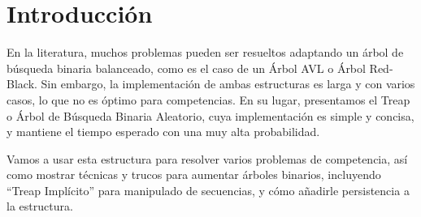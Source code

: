 \section{Introducción}

En la literatura, muchos problemas pueden ser resueltos adaptando un árbol de búsqueda binaria balanceado, como es el caso de un Árbol AVL o Árbol Red-Black.
Sin embargo, la implementación de ambas estructuras es larga y con varios casos, lo que no es óptimo para competencias.
En su lugar, presentamos el Treap o Árbol de Búsqueda Binaria Aleatorio, cuya implementación es simple y concisa,
y mantiene el tiempo esperado con una muy alta probabilidad.

Vamos a usar esta estructura para resolver varios problemas de competencia,
así como mostrar técnicas y trucos para aumentar árboles binarios,
incluyendo ``Treap Implícito'' para manipulado de secuencias, y cómo añadirle persistencia a la estructura.
